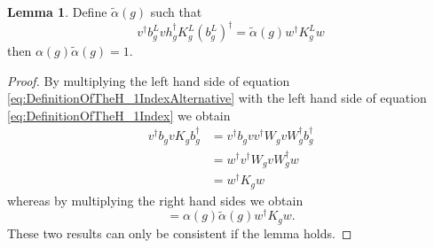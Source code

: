 \documentclass[12pt,a4paper,twoside]{article}
\theoremstyle{definition}
\newtheorem{lemma}[theorem]{Lemma}
\numberwithin{equation}{section}
\begin{document}
\begin{lemma}
	Define $\tilde{\alpha}(g)$ such that
	\begin{equation}\label{eq:DefinitionOfTheH_1IndexAlternative}
		v^\dagger b_g^L v h_g^\dagger K_g^L (b_g^L)^\dagger=\tilde{\alpha}(g)w^\dagger K_g^L w
	\end{equation}
	then $\alpha(g)\tilde{\alpha}(g)=1$.
\end{lemma}
\begin{proof}
	By multiplying the left hand side of equation \eqref{eq:DefinitionOfTheH_1IndexAlternative} with the left hand side of equation \eqref{eq:DefinitionOfTheH_1Index} we obtain
	\begin{align}
		v^\dagger b_g v K_g b_g^\dagger&=v^\dagger b_g v v^\dagger W_g v W_g^\dagger b_g^\dagger\\
		&=w^\dagger v^\dagger W_g v W_g^\dagger w\\
		&=w^\dagger K_g w
	\end{align}
	whereas by multiplying the right hand sides we obtain
	\begin{equation}
		=\alpha(g)\tilde{\alpha}(g)w^\dagger K_g w.
	\end{equation}
	These two results can only be consistent if the lemma holds.
\end{proof}
\end{document}
